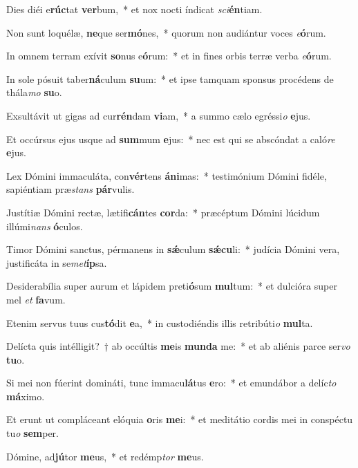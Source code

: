 \item Dies diéi e\textbf{rúc}tat \textbf{ver}bum,~* et nox nocti índicat \textit{sci}\textbf{én}tiam.
\item Non sunt loquélæ, \textbf{ne}que ser\textbf{mó}nes,~* quorum non audiántur voces \textit{e}\textbf{ó}rum.
\item In omnem terram exívit \textbf{so}nus e\textbf{ó}rum:~* et in fines orbis terræ verba \textit{e}\textbf{ó}rum.
\item In sole pósuit taber\textbf{ná}culum \textbf{su}um:~* et ipse tamquam sponsus procédens de thála\textit{mo} \textbf{su}o.
\item Exsultávit ut gigas ad cur\textbf{rén}dam \textbf{vi}am,~* a summo cælo egréssi\textit{o} \textbf{e}jus.
\item Et occúrsus ejus usque ad \textbf{sum}mum \textbf{e}jus:~* nec est qui se abscóndat a caló\textit{re} \textbf{e}jus.
\item Lex Dómini immaculáta, con\textbf{vér}tens \textbf{á}\textbf{ni}mas:~* testimónium Dómini fidéle, sapiéntiam præ\textit{stans} \textbf{pár}vulis.
\item Justítiæ Dómini rectæ, lætifi\textbf{cán}tes \textbf{cor}da:~* præcéptum Dómini lúcidum illúmi\textit{nans} \textbf{ó}culos.
\item Timor Dómini sanctus, pérmanens in \textbf{sǽ}culum \textbf{sǽ}\textbf{cu}li:~* judícia Dómini vera, justificáta in se\textit{met}\textbf{íp}sa.
\item Desiderabília super aurum et lápidem preti\textbf{ó}sum \textbf{mul}tum:~* et dulcióra super mel \textit{et} \textbf{fa}vum.
\item Etenim servus tuus cus\textbf{tó}dit \textbf{e}a,~* in custodiéndis illis retribúti\textit{o} \textbf{mul}ta.
\item Delícta quis intélligit?~† ab occúltis \textbf{me}is \textbf{mun}\textbf{da} me:~* et ab aliénis parce ser\textit{vo} \textbf{tu}o.
\item Si mei non fúerint domináti, tunc immacu\textbf{lá}tus \textbf{e}ro:~* et emundábor a delíc\textit{to} \textbf{má}ximo.
\item Et erunt ut compláceant elóquia \textbf{o}ris \textbf{me}i:~* et meditátio cordis mei in conspéctu tu\textit{o} \textbf{sem}per.
\item Dómine, ad\textbf{jú}tor \textbf{me}us,~* et redémp\textit{tor} \textbf{me}us.
